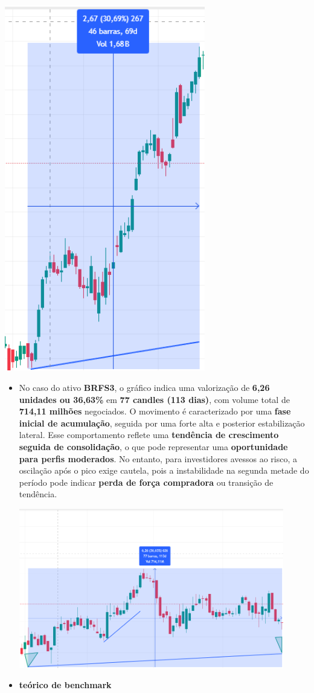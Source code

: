 \documentclass[
  letterpaper,
  DIV=11,
  numbers=noendperiod]{scrartcl}
\begin{document}
\includegraphics[width=3.44792in,height=\textheight,keepaspectratio]{images/clipboard-3626293039.png}

\begin{itemize}
\item
  No caso do ativo \textbf{BRFS3}, o gráfico indica uma valorização de
  \textbf{6,26 unidades ou 36,63\%} em \textbf{77 candles (113 dias)},
  com volume total de \textbf{714,11 milhões} negociados. O movimento é
  caracterizado por uma \textbf{fase inicial de acumulação}, seguida por
  uma forte alta e posterior estabilização lateral. Esse comportamento
  reflete uma \textbf{tendência de crescimento seguida de consolidação},
  o que pode representar uma \textbf{oportunidade para perfis
  moderados}. No entanto, para investidores avessos ao risco, a
  oscilação após o pico exige cautela, pois a instabilidade na segunda
  metade do período pode indicar \textbf{perda de força compradora} ou
  transição de tendência.

  \includegraphics[width=4.55208in,height=\textheight,keepaspectratio]{images/BAH_BRFS3.PNG}
\item
  \textbf{teórico de benchmark}
\end{itemize}
\end{document}
